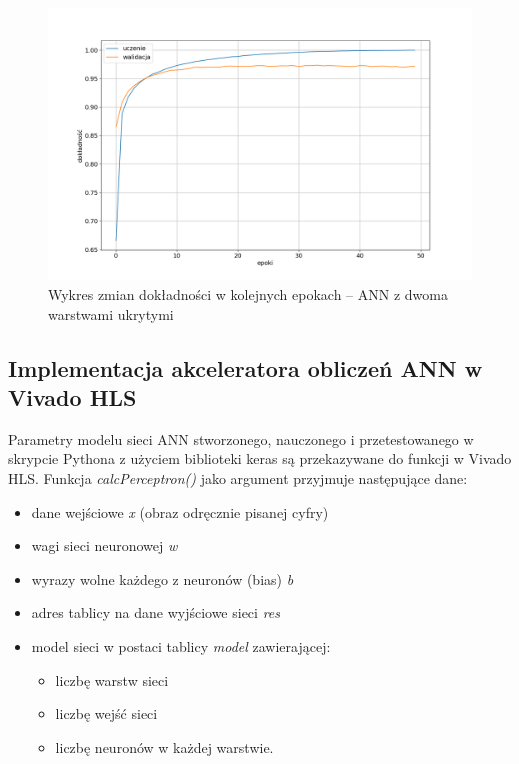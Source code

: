\begin{figure}
    \centering
    \includegraphics[width=\textwidth]{img/keras-accuracy2.png}
    \caption{Wykres zmian dokładności w kolejnych epokach -- ANN z dwoma warstwami ukrytymi}
    \label{keras-accuracy2}
\end{figure}


\subsection{Implementacja akceleratora obliczeń ANN w Vivado HLS}
  Parametry modelu sieci ANN stworzonego, nauczonego i przetestowanego w skrypcie Pythona z użyciem biblioteki keras są przekazywane do funkcji w Vivado HLS. Funkcja \emph{calcPerceptron()} jako argument przyjmuje następujące dane:
  \begin{itemize}
    \item dane wejściowe \emph{x} (obraz odręcznie pisanej cyfry)
    \item wagi sieci neuronowej \emph{w}
    \item wyrazy wolne każdego z neuronów (bias) \emph{b}
    \item adres tablicy na dane wyjściowe sieci \emph{res}
    \item model sieci w postaci tablicy \emph{model} zawierającej:
    \begin{itemize}
      \item liczbę warstw sieci
      \item liczbę wejść sieci
      \item liczbę neuronów w każdej warstwie.
    \end{itemize}
  \end{itemize}

